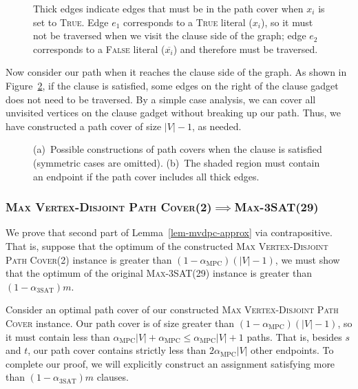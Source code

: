 \documentclass[11pt]{article}
\def\MPC{\mathrm{MPC}}
\def\SAT{\mathrm{3SAT}}
\begin{document}
\begin{figure}
    \centering
    
    \caption{Thick edges indicate edges that must be in the path cover when $x_i$ is set to \textsc{True}. Edge $e_1$ corresponds to a \textsc{True} literal ($x_i$), so it must not be traversed when we visit the clause side of the graph; edge $e_2$ corresponds to a \textsc{False} literal ($\overline{x_i}$) and therefore must be traversed.}
    \label{fig:assignment}
\end{figure}

Now consider our path when it reaches the clause side of the graph. As shown in Figure~\ref{fig:satisfy}, if the clause is satisfied, some edges on the right of the clause gadget does not need to be traversed. By a simple case analysis, we can cover all unvisited vertices on the clause gadget without breaking up our path. Thus, we have constructed a path cover of size $|V|-1$, as needed.

\begin{figure}
    \centering
    \begin{subfigure}[b]{0.6\textwidth}
    	\centering
        
        \caption{}
        \label{fig:satisfy}
    \end{subfigure}
    \begin{subfigure}[b]{0.3\textwidth}
    	\centering
        
        \caption{}
        \label{fig:notsatisfy}
    \end{subfigure}
    \caption{(a)~Possible constructions of path covers when the clause is satisfied (symmetric cases are omitted). (b)~The shaded region must contain an endpoint if the path cover includes all thick edges.}
\end{figure}

\subsubsection*{\textsc{Max Vertex-Disjoint Path Cover(2)}$\implies$\textsc{Max-3SAT(29)}}

We prove that second part of Lemma~\ref{lem-mvdpc-approx} via contrapositive. That is, suppose that the optimum of the constructed \textsc{Max Vertex-Disjoint Path Cover(2)} instance is greater than $(1-\alpha_{\MPC})(|V|-1)$, we must show that the optimum of the original \textsc{Max-3SAT(29)} instance is greater than $(1-\alpha_{\SAT})m$.

Consider an optimal path cover of our constructed \textsc{Max Vertex-Disjoint Path Cover} instance. Our path cover is of size greater than $(1-\alpha_{\MPC})(|V|-1)$, so it must contain less than $\alpha_{\MPC}|V|+\alpha_{\MPC} \leq \alpha_{\MPC}|V| + 1$ paths.  That is, besides $s$ and $t$, our path cover contains strictly less than $2\alpha_{\MPC}|V|$ other endpoints. To complete our proof, we will explicitly construct an assignment satisfying more than $(1-\alpha_{\SAT})m$ clauses.
\end{document}
